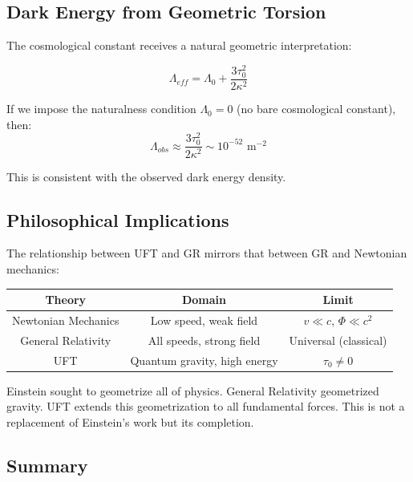 \subsection{Dark Energy from Geometric Torsion}

The cosmological constant receives a natural geometric interpretation:

\begin{equation}
    \Lambda_{eff} = \Lambda_0 + \frac{3\tau_0^2}{2\kappa^2}
    \label{eq:dark_energy_torsion}
\end{equation}

If we impose the naturalness condition $\Lambda_0 = 0$ (no bare cosmological constant), then:
\begin{equation}
    \Lambda_{obs} \approx \frac{3\tau_0^2}{2\kappa^2} \sim 10^{-52} \text{ m}^{-2}
\end{equation}

This is consistent with the observed dark energy density.

\subsection{Philosophical Implications}

The relationship between UFT and GR mirrors that between GR and Newtonian mechanics:

\begin{center}
\begin{tabular}{@{}ccc@{}}
\toprule
Theory & Domain & Limit \\
\midrule
Newtonian Mechanics & Low speed, weak field & $v \ll c$, $\Phi \ll c^2$ \\
General Relativity & All speeds, strong field & Universal (classical) \\
UFT & Quantum gravity, high energy & $\tau_0 \neq 0$ \\
\bottomrule
\end{tabular}
\end{center}

\begin{remark}
Einstein sought to geometrize all of physics. General Relativity geometrized gravity. UFT extends this geometrization to all fundamental forces. This is not a replacement of Einstein's work but its completion.
\end{remark}

\subsection{Summary}


